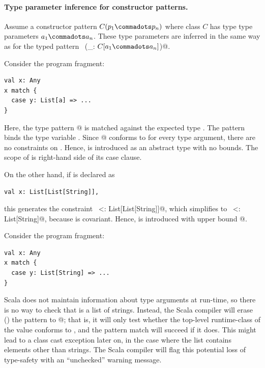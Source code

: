 \paragraph{Type parameter inference for constructor patterns.}
Assume a constructor pattern $C(p_1 \commadots p_n)$ where class $C$
has type type parameters $a_1 \commadots a_n$.  These type parameters
are inferred in the same way as for the typed pattern
~\lstinline@(_: $C[a_1 \commadots a_n]$)@.

\example
Consider the program fragment:
\begin{lstlisting}
val x: Any
x match {
  case y: List[a] => ...
}
\end{lstlisting}
Here, the type pattern \lstinline@List[a]@ is matched against the
expected type \lstinline@Any@. The pattern binds the type variable
\lstinline@a@.  Since \lstinline@List[a]@ conforms to \lstinline@Any@
for every type argument, there are no constraints on \lstinline@a@.
Hence, \lstinline@a@ is introduced as an abstract type with no
bounds. The scope of \lstinline@a@ is right-hand side of its case clause.

On the other hand, if \lstinline@x@ is declared as
\begin{lstlisting}
val x: List[List[String]],
\end{lstlisting}
this generates the constraint 
~\lstinline@List[a] <: List[List[String]]@, which simplifies to 
~\lstinline@a <: List[String]@, because \lstinline@List@ is covariant. Hence,
\lstinline@a@ is introduced with upper bound
\lstinline@List[String]@.

\example
Consider the program fragment: 
\begin{lstlisting}
val x: Any
x match {
  case y: List[String] => ...
}
\end{lstlisting}
Scala does not maintain information about type arguments at run-time,
so there is no way to check that \lstinline@x@ is a list of strings.
Instead, the Scala compiler will erase () the
pattern to \lstinline@List[_]@; that is, it will only test whether the
top-level runtime-class of the value \lstinline@x@ conforms to
\lstinline@List@, and the pattern match will succeed if it does.  This
might lead to a class cast exception later on, in the case where the
list \lstinline@x@ contains elements other than strings.  The Scala
compiler will flag this potential loss of type-safety with an
``unchecked'' warning message.

